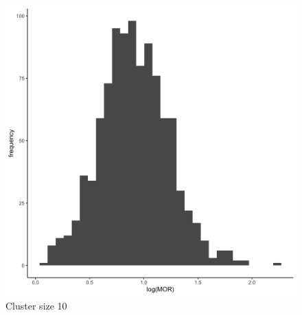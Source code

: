 \documentclass[
  letterpaper,
  DIV=11,
  numbers=noendperiod,
  titlepage]{scrartcl}
\begin{document}
\begin{figure}
\begin{minipage}[t]{0.24\linewidth}
{{\includegraphics{../../plots/two-lvl-ran-slope/high-prev/hist_30_10_two_lvl_slp_high_prev_q3.png}

}

\caption{Cluster size 10}

}

\end{minipage}%
%
\begin{minipage}[t]{0.24\linewidth}

{\centering 

}
\end{minipage}
\end{figure}
\end{document}
